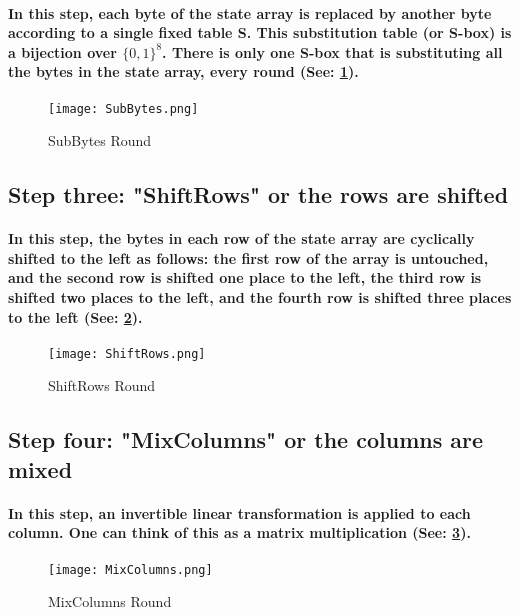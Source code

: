\paragraph{In this step, each byte of the state array is replaced by another byte according to a single fixed table S. This substitution table (or S-box) is a bijection over $\{0,1\}^8$. There is only one S-box that is substituting all the bytes in the state array, every round (See: \ref{fig: SubBytes}).}\cite[p. 186]{Katz}

\begin{figure}[H]
\centering
\texttt{[image: SubBytes.png]}
\caption{\label{fig: SubBytes} SubBytes Round}\cite[Webpage]{Crawford}
\end{figure}


\subsection{Step three: "ShiftRows" or the rows are shifted}
\paragraph{In this step, the bytes in each row of the state array are cyclically shifted to the left as follows: the first row of the array is untouched, and the second row is shifted one place to the left, the third row is shifted two places to the left, and the fourth row is shifted three places to the left (See: \ref{fig: ShiftRows}).}\cite[p. 186]{Katz}

\begin{figure}[H]
\centering
\texttt{[image: ShiftRows.png]}
\caption{\label{fig: ShiftRows} ShiftRows Round}\cite[Webpage]{Crawford}
\end{figure}

\subsection{Step four: "MixColumns" or the columns are mixed}
\paragraph{In this step, an invertible linear transformation is applied to each column. One can think of this as a matrix multiplication (See: \ref{fig: MixColumns}).}\cite[p. 186]{Katz}

\begin{figure}[H]
\centering
\texttt{[image: MixColumns.png]}
\caption{\label{fig: MixColumns} MixColumns Round}\cite[Webpage]{Crawford}
\end{figure}

